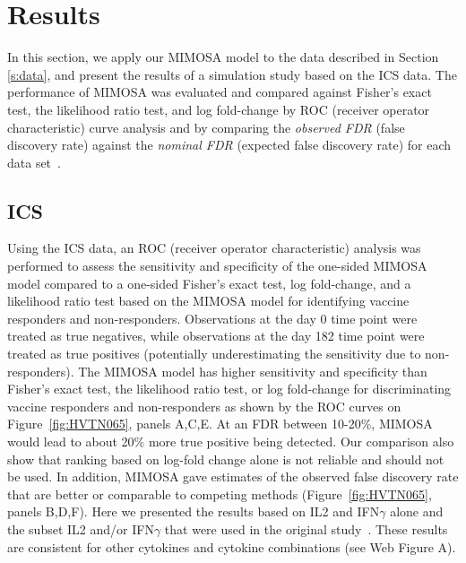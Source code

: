 \documentclass[useAMS,referee,usenatbib]{biom}
\begin{document}
\section{Results}
\label{s:results}
In this section, we apply our MIMOSA model to the data described in Section \ref{s:data}, and present the results of a simulation study based on the ICS data. The performance of MIMOSA was evaluated and compared against Fisher's exact test, the likelihood ratio test, and log fold-change by ROC (receiver operator characteristic) curve analysis and by comparing the \textit{observed FDR} (false discovery rate) against the \textit{nominal FDR} (expected false discovery rate) for each data set~\citep{Storey:2002vj}.


\subsection{ICS}
Using the ICS data, an ROC (receiver operator characteristic) analysis was performed to assess the sensitivity and specificity of the one-sided MIMOSA model compared to a one-sided Fisher's exact test, log fold-change, and a likelihood ratio test based on the MIMOSA model for identifying vaccine responders and non-responders. Observations at the day 0 time point were treated as true negatives, while observations at the day 182 time point were treated as true positives (potentially underestimating the sensitivity due to non-responders). The MIMOSA model has higher sensitivity and specificity than Fisher's exact test, the likelihood ratio test, or log fold-change for discriminating vaccine responders and non-responders  as shown by the ROC curves on Figure~\ref{fig:HVTN065}, panels A,C,E. 
At an FDR between 10-20\%, MIMOSA would lead to about 20\% more true positive being detected. Our comparison also show that ranking based on log-fold change alone is not reliable and should not be used.
In addition, MIMOSA gave estimates of the observed false discovery rate that are better or comparable to competing methods (Figure~\ref{fig:HVTN065}, panels B,D,F). Here we presented the results based on IL2 and IFN$\gamma$ alone and the subset IL2 and/or IFN$\gamma$ that were used in the original study~\citep{Goepfert:2011ci}. These results are consistent for other cytokines and cytokine combinations (see Web Figure A).
\end{document}
